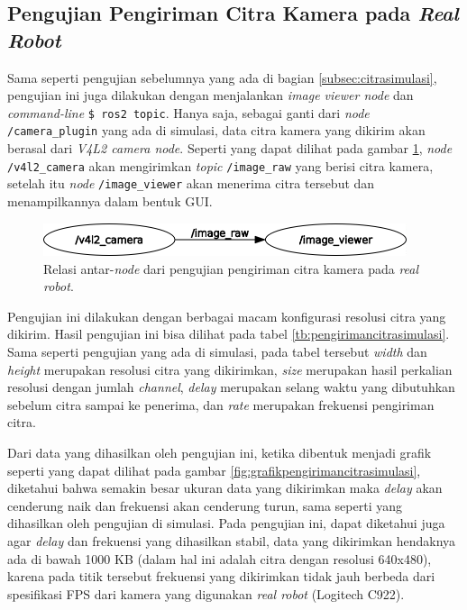 \subsection{Pengujian Pengiriman Citra Kamera pada \emph{Real Robot}}
\label{subsec:citrarobot}

Sama seperti pengujian sebelumnya yang ada di bagian \ref{subsec:citrasimulasi},
  pengujian ini juga dilakukan dengan menjalankan \emph{image viewer node} dan \emph{command-line} \lstinline{$ ros2 topic}.
Hanya saja, sebagai ganti dari \emph{node} \lstinline{/camera_plugin} yang ada di simulasi,
  data citra kamera yang dikirim akan berasal dari \emph{V4L2 camera node}.
Seperti yang dapat dilihat pada gambar \ref{fig:rosgraphcamera},
  \emph{node} \lstinline{/v4l2_camera} akan mengirimkan \emph{topic} \lstinline{/image_raw} yang berisi citra kamera,
  setelah itu \emph{node} \lstinline{/image_viewer} akan menerima citra tersebut dan menampilkannya dalam bentuk GUI.

\begin{figure}[ht]
  \centering
  \includegraphics[width=0.95\textwidth,keepaspectratio]{gambar/rosgraph-camera.png}
  \caption{Relasi antar-\emph{node} dari pengujian pengiriman citra kamera pada \emph{real robot}.}
  \label{fig:rosgraphcamera}
\end{figure}

Pengujian ini dilakukan dengan berbagai macam konfigurasi resolusi citra yang dikirim.
Hasil pengujian ini bisa dilihat pada tabel \ref{tb:pengirimancitrasimulasi}.
Sama seperti pengujian yang ada di simulasi, pada tabel tersebut \emph{width} dan \emph{height} merupakan resolusi citra yang dikirimkan,
  \emph{size} merupakan hasil perkalian resolusi dengan jumlah \emph{channel},
  \emph{delay} merupakan selang waktu yang dibutuhkan sebelum citra sampai ke penerima,
  dan \emph{rate} merupakan frekuensi pengiriman citra.



Dari data yang dihasilkan oleh pengujian ini,
  ketika dibentuk menjadi grafik seperti yang dapat dilihat pada gambar \ref{fig:grafikpengirimancitrasimulasi},
  diketahui bahwa semakin besar ukuran data yang dikirimkan maka \emph{delay} akan cenderung naik dan frekuensi akan cenderung turun,
  sama seperti yang dihasilkan oleh pengujian di simulasi.
Pada pengujian ini, dapat diketahui juga agar \emph{delay} dan frekuensi yang dihasilkan stabil,
  data yang dikirimkan hendaknya ada di bawah 1000 KB (dalam hal ini adalah citra dengan resolusi 640x480),
  karena pada titik tersebut frekuensi yang dikirimkan tidak jauh berbeda dari spesifikasi FPS dari kamera yang digunakan \emph{real robot} (Logitech C922).


